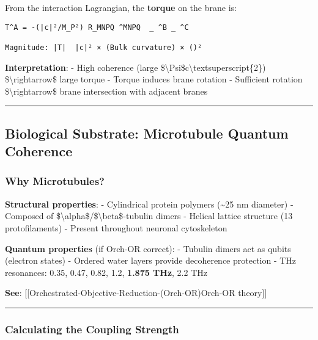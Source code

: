 From the interaction Lagrangian, the \textbf{torque} on the brane is:

\begin{verbatim}
T^A = -(|c|²/M_P²) R_MNPQ ^MNPQ  _ ^B _ ^C

Magnitude: |T|  |c|² × (Bulk curvature) × ()²
\end{verbatim}

\textbf{Interpretation}: - High coherence (large
\textbar\$\textbackslash Psi\$c\textbar\textbackslash textsuperscript\{2\})
\$\textbackslash rightarrow\$ large torque - Torque induces brane
rotation - Sufficient rotation \$\textbackslash rightarrow\$ brane
intersection with adjacent branes

\begin{center}\rule{0.5\linewidth}{0.5pt}\end{center}

\subsection{Biological Substrate: Microtubule Quantum
Coherence}\label{biological-substrate-microtubule-quantum-coherence}

\subsubsection{Why Microtubules?}\label{why-microtubules}

\textbf{Structural properties}: - Cylindrical protein polymers
(\textasciitilde25 nm diameter) - Composed of
\$\textbackslash alpha\$/\$\textbackslash beta\$-tubulin dimers -
Helical lattice structure (13 protofilaments) - Present throughout
neuronal cytoskeleton

\textbf{Quantum properties} (if Orch-OR correct): - Tubulin dimers act
as qubits (electron states) - Ordered water layers provide decoherence
protection - THz resonances: 0.35, 0.47, 0.82, 1.2, \textbf{1.875 THz},
2.2 THz

\textbf{See}:
{[}{[}Orchestrated-Objective-Reduction-(Orch-OR)\textbar Orch-OR
theory{]}{]}

\begin{center}\rule{0.5\linewidth}{0.5pt}\end{center}

\subsubsection{Calculating the Coupling
Strength}\label{calculating-the-coupling-strength}

